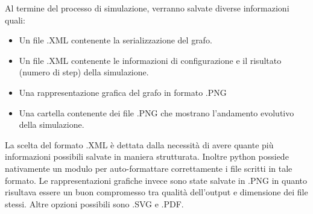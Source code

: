 \documentclass{article}
\begin{document}
Al termine del processo di simulazione, verranno salvate diverse informazioni quali:
\begin{itemize}
\item Un file .XML contenente la serializzazione del grafo.
\item Un file .XML contenente le informazioni di configurazione e il risultato (numero di step) della             simulazione.
\item Una rappresentazione grafica del grafo in formato .PNG
\item Una cartella contenente dei file .PNG che mostrano l'andamento evolutivo della simulazione.
\end{itemize}
\newline
La scelta del formato .XML è dettata dalla necessità di avere quante più informazioni possibili salvate in maniera strutturata. Inoltre python possiede nativamente un modulo per auto-formattare correttamente i file scritti in tale formato.
Le rappresentazioni grafiche invece sono state salvate in .PNG in quanto risultava essere un buon compromesso tra qualità dell'output e dimensione dei file stessi. Altre opzioni possibili sono .SVG e .PDF.\newline
\end{document}
